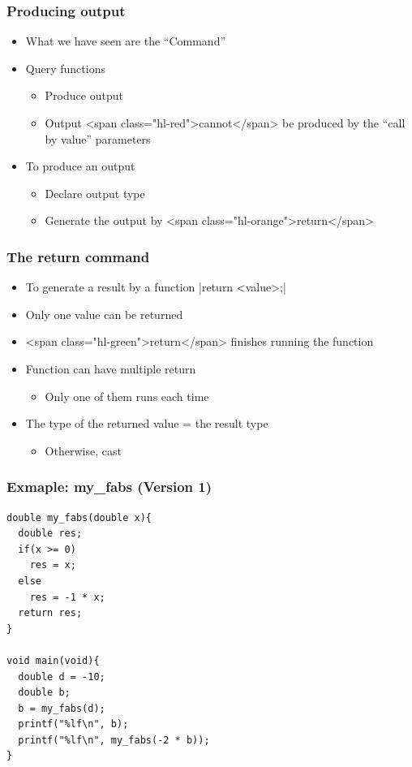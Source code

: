 \documentclass{../c-lecture}
\begin{document}
\begin{frame}
  \frametitle{Producing output}
  \begin{itemize}
    \item What we have seen are the “Command”
    \item Query functions
    \begin{itemize}
      \item Produce output
      \item
        Output <span class="hl-red">cannot</span> be produced by the “call by
        value” parameters

    \end{itemize}
    \item To produce an output
    \begin{itemize}
      \item Declare output type
      \item Generate the output by <span class="hl-orange">return</span>
    \end{itemize}
  \end{itemize}
\end{frame}

\begin{frame}[fragile]
  \frametitle{The return command}
  \begin{itemize}
    \item To generate a result by a function
    |return <value>;|
    \item Only one value can be returned
    \item <span class="hl-green">return</span> finishes running the function
    \item Function can have multiple return
    \begin{itemize}
      \item Only one of them runs each time
    \end{itemize}
    \item The type of the returned value = the result type
    \begin{itemize}
      \item Otherwise, cast
    \end{itemize}
  \end{itemize}
\end{frame}

\begin{frame}[fragile]
  \frametitle{Exmaple: my_fabs (Version 1)}
  \begin{verbatim}
double my_fabs(double x){
  double res;
  if(x >= 0)
    res = x;
  else
    res = -1 * x;
  return res;
}

void main(void){
  double d = -10;
  double b;
  b = my_fabs(d);
  printf("%lf\n", b);
  printf("%lf\n", my_fabs(-2 * b));
}
  \end{verbatim}
\end{frame}
\end{document}
